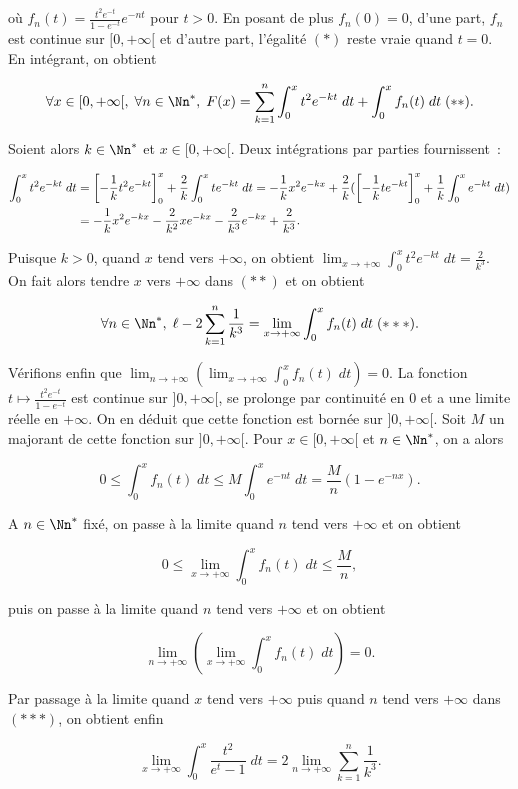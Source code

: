 {\begin{enumerate}
{où $f_n(t)=\frac{t^2e^{-t}}{1-e^{-t}}e^{-nt}$ pour $t>0$. En posant de plus $f_n(0)=0$, d'une part, $f_n$ est continue sur $[0,+\infty[$ et d'autre part, l'égalité $(*)$ reste vraie quand $t=0$. En intégrant, on obtient

$$\forall x\in[0,+\infty[,\;\forall n\in\Nn^*,\;F(x)=\sum_{k=1}^{n}\int_{0}^{x}t^2e^{-kt}\;dt+\int_{0}^{x}f_n(t)\;dt\;(**).$$

Soient alors $k\in\Nn^*$ et $x\in[0,+\infty[$. Deux intégrations par parties fournissent~:

\begin{align*}\ensuremath
\int_{0}^{x}t^2e^{-kt}\;dt&=\left[-\frac{1}{k}t^2e^{-kt}\right]_{0}^{x}+\frac{2}{k}\int_{0}^{x}te^{-kt}\;dt
=-\frac{1}{k}x^2e^{-kx}+\frac{2}{k}(\left[-\frac{1}{k}te^{-kt}\right]_{0}^{x}+\frac{1}{k}\int_{0}^{x}e^{-kt}\;dt)\\
 &=-\frac{1}{k}x^2e^{-kx}-\frac{2}{k^2}xe^{-kx}-\frac{2}{k^3}e^{-kx}+\frac{2}{k^3}.
\end{align*}

Puisque $k>0$, quand $x$ tend vers $+\infty$, on obtient $\lim_{x\rightarrow +\infty}\int_{0}^{x}t^2e^{-kt}\;dt=\frac{2}{k^3}$. On fait alors tendre $x$ vers $+\infty$ dans $(**)$ et on obtient

$$\forall n\in\Nn^*,\;\ell-2\sum_{k=1}^{n}\frac{1}{k^3}=\lim_{x\rightarrow +\infty}\int_{0}^{x}f_n(t)\;dt\;(***).$$

Vérifions enfin que $\lim_{n\rightarrow +\infty}\left(\lim_{x\rightarrow +\infty}\int_{0}^{x}f_n(t)\;dt\right)=0$. La fonction $t\mapsto\frac{t^2e^{-t}}{1-e^{-t}}$ est continue sur $]0,+\infty[$, se prolonge par continuité en $0$ et a une limite réelle en $+\infty$. On en déduit que cette fonction est bornée sur $]0,+\infty[$. Soit $M$ un majorant de cette fonction sur $]0,+\infty[$. Pour $x\in[0,+\infty[$ et $n\in\Nn^*$, on a alors

$$0\leq\int_{0}^{x}f_n(t)\;dt\leq M\int_{0}^{x}e^{-nt}\;dt=\frac{M}{n}(1-e^{-nx}).$$

A $n\in\Nn^*$ fixé, on passe à la limite quand $n$ tend vers $+\infty$ et on obtient

$$0\leq\lim_{x\rightarrow +\infty}\int_{0}^{x}f_n(t)\;dt\leq\frac{M}{n},$$

puis on passe à la limite quand $n$ tend vers $+\infty$ et on obtient

$$\lim_{n\rightarrow +\infty}\left(\lim_{x\rightarrow +\infty}\int_{0}^{x}f_n(t)\;dt\right)=0.$$

Par passage à la limite quand $x$ tend vers $+\infty$ puis quand $n$ tend vers $+\infty$ dans $(***)$, on obtient enfin

$$\lim_{x\rightarrow +\infty}\int_{0}^{x}\frac{t^2}{e^t-1}\;dt=2\lim_{n\rightarrow +\infty}\sum_{k=1}^{n}\frac{1}{k^3}.$$}
\end{enumerate}
}